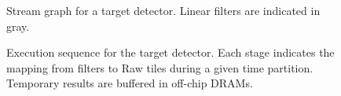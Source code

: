 \begin{figure}[t]
\vspace{-18pt}
\centering
{}
\vspace{-6pt}
\caption{Stream graph for a target detector.  Linear filters are indicated in gray.
\protect\label{fig:target-graph}}
\vspace{12pt}
\vspace{-6pt}
\caption{Execution sequence for the target detector.  Each stage
indicates the mapping from filters to Raw tiles during a given time
partition.  Temporary results are buffered in off-chip DRAMs.
\protect\label{fig:target-exec}}
\vspace{-8pt}
\end{figure}
